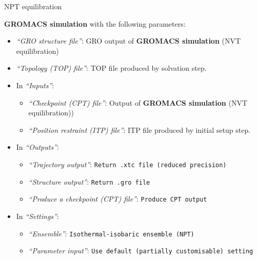\documentclass[twocolumn]{bmcart}%
\providecommand{\tightlist}{%
  \setlength{\itemsep}{0pt}\setlength{\parskip}{0pt}}
\begin{document}
\begin{handson_box_colour}{NPT
equilibration}


  \textbf{GROMACS simulation} with the following parameters:

  \begin{itemize}
  \tightlist
  \item
    \emph{``GRO structure file''}: GRO output of \textbf{GROMACS
    simulation} (NVT equilibration)
  \item
    \emph{``Topology (TOP) file''}: TOP file produced by solvation step.
  \item
    In \emph{``Inputs''}:

    \begin{itemize}
    \tightlist
    \item
      \emph{``Checkpoint (CPT) file''}: Output of \textbf{GROMACS
      simulation} (NVT equilibration))
    \item
      \emph{``Position restraint (ITP) file''}: ITP file produced by
      initial setup step.
    \end{itemize}
  \item
    In \emph{``Outputs''}:

    \begin{itemize}
    \tightlist
    \item
      \emph{``Trajectory output''}:
      \texttt{Return\ .xtc\ file\ (reduced\ precision)}
    \item
      \emph{``Structure output''}: \texttt{Return\ .gro\ file}
    \item
      \emph{``Produce a checkpoint (CPT) file''}:
      \texttt{Produce\ CPT\ output}
    \end{itemize}
  \item
    In \emph{``Settings''}:

    \begin{itemize}
    \tightlist
    \item
      \emph{``Ensemble''}: \texttt{Isothermal-isobaric\ ensemble\ (NPT)}
    \item
      \emph{``Parameter input''}:
      \texttt{Use\ default\ (partially\ customisable)\ setting}


\end{itemize}
\end{itemize}
\end{handson_box_colour}
\end{document}
